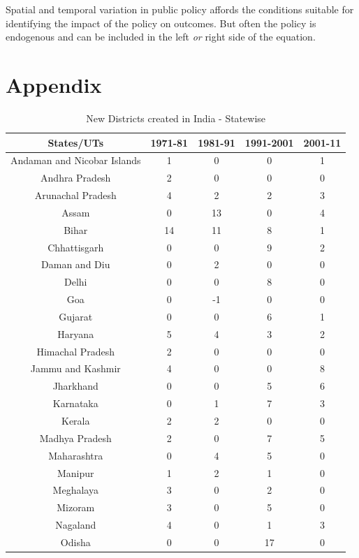 \documentclass[12pt, a4paper]{article}
\begin{document}
Spatial and temporal variation in public policy affords the conditions suitable for identifying the impact of the policy on outcomes. But often the policy is endogenous and can be included in the left \textit{or} right side of the equation. 
\printbibliography
\section*{Appendix}
\begin{table}[h!]
	\centering
	\caption{New Districts created in India - Statewise}
	\label{Fig1}
	\begin{tabular}{c|cccc} 
		\hline
		States/UTs & 1971-81 & 1981-91 & 1991-2001 & 2001-11 \\
		\hline 
		Andaman and Nicobar Islands & 1 & 0 & 0 & 1  \\ 
		Andhra Pradesh & 2 & 0 & 0 & 0  \\ 
		Arunachal Pradesh & 4 & 2 & 2 & 3  \\ 
		Assam & 0 & 13 & 0 & 4  \\ 
		Bihar & 14 & 11 & 8 & 1  \\ 
		Chhattisgarh & 0 & 0 & 9 & 2  \\ 
		Daman and Diu & 0 & 2 & 0 & 0  \\ 
		Delhi & 0 & 0 & 8 & 0  \\ 
		Goa & 0 & -1 & 0 & 0  \\ 
		Gujarat & 0 & 0 & 6 & 1  \\ 
		Haryana & 5 & 4 & 3 & 2  \\ 
		Himachal Pradesh & 2 & 0 & 0 & 0  \\ 
		Jammu and Kashmir & 4 & 0 & 0 & 8  \\ 
		Jharkhand & 0 & 0 & 5 & 6  \\ 
		Karnataka & 0 & 1 & 7 & 3  \\ 
		Kerala & 2 & 2 & 0 & 0  \\ 
		Madhya Pradesh & 2 & 0 & 7 & 5  \\ 
		Maharashtra & 0 & 4 & 5 & 0  \\ 
		Manipur & 1 & 2 & 1 & 0  \\ 
		Meghalaya & 3 & 0 & 2 & 0  \\ 
		Mizoram & 3 & 0 & 5 & 0  \\ 
		Nagaland & 4 & 0 & 1 & 3  \\ 
		Odisha & 0 & 0 & 17 & 0  \\ 

\end{tabular}
\end{table}
\end{document}
